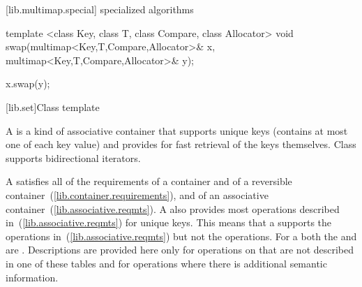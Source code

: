 [lib.multimap.special]{ specialized algorithms}

%
%
\begin{itemdecl}
template <class Key, class T, class Compare, class Allocator>
  void swap(multimap<Key,T,Compare,Allocator>& x,
            multimap<Key,T,Compare,Allocator>& y);
\end{itemdecl}

\begin{itemdescr}
\pnum
\effects
\begin{codeblock}
    x.swap(y);
\end{codeblock}
\end{itemdescr}

[lib.set]{Class template }

\pnum
{}%
A
is a kind of associative container that supports unique keys (contains at most one of each key value) and
provides for fast retrieval of the keys themselves.
Class
supports bidirectional iterators.

\pnum
A  satisfies all of the requirements of a container and of a reversible
container~(\ref{lib.container.requirements}), and of an associative
container~(\ref{lib.associative.reqmts}).
A
also provides most operations described in~(\ref{lib.associative.reqmts})
for unique keys.
This means that a
supports the
operations in~(\ref{lib.associative.reqmts})
but not the
operations.
For a
both the
and
are
.
Descriptions are provided here only for operations on
that are not described in one of these tables
and for operations where there is additional semantic information.

